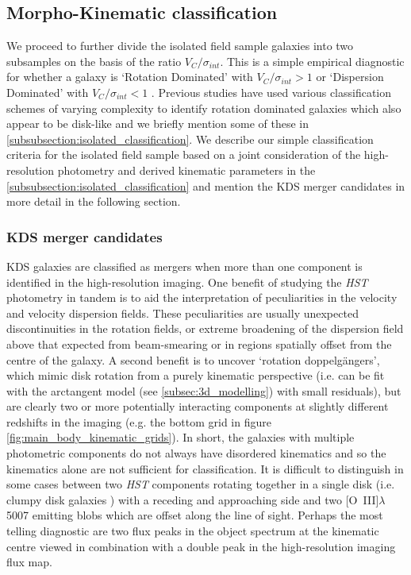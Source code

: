 \documentclass[fleqn,usenatbib]{mn2e}
\begin{document}
\subsection{Morpho-Kinematic classification}\label{subsec:morpho-kin-class}
We proceed to further divide the isolated field sample galaxies into two subsamples on the basis of the ratio $V_{C}/\sigma_{int}$.
This is a simple empirical diagnostic for whether a galaxy is `Rotation Dominated' with $V_{C}/\sigma_{int} > 1$ or `Dispersion Dominated' with $V_{C}/\sigma_{int} < 1$  \citep[i.e. a simple way to measure the prevalence of rotational and random motions][]{Epinat2012,Wisnioski2015,Stott2016,Harrison2017}.
Previous studies have used various classification schemes of varying complexity to identify rotation dominated galaxies which also appear to be disk-like and we briefly mention some of these in \cref{subsubsection:isolated_classification}.
We describe our simple classification criteria for the isolated field sample based on a joint consideration of the high-resolution photometry and derived kinematic parameters in the \cref{subsubsection:isolated_classification} and mention the KDS merger candidates in more detail in the following section.

\subsubsection{KDS merger candidates}\label{subsubsection:merger_candidates}
KDS galaxies are classified as mergers when more than one component is identified in the high-resolution imaging.  
One benefit of studying the {\em HST} photometry in tandem is to aid the interpretation of peculiarities in the velocity and velocity dispersion fields.
These peculiarities are usually unexpected discontinuities in the rotation fields, or extreme broadening of the dispersion field above that expected from beam-smearing or in regions spatially offset from the centre of the galaxy.
A second benefit is to uncover `rotation doppelg{\"a}ngers', which mimic disk rotation from a purely kinematic perspective (i.e. can be fit with the arctangent model (see \cref{subsec:3d_modelling}) with small residuals), but are clearly two or more potentially interacting components at slightly different redshifts in the imaging (e.g. the bottom grid in figure \ref{fig:main_body_kinematic_grids}).
In short, the galaxies with multiple photometric components do not always have disordered kinematics and so the kinematics alone are not sufficient for classification.
It is difficult to distinguish in some cases between two {\em HST} components rotating together in a single disk (i.e. clumpy disk galaxies \citep[e.g.][]{Elmegreen2004,Bournaud2007}) with a receding and approaching side and two [O~{\sc III}]$\lambda$5007 emitting blobs which are offset along the line of sight.
Perhaps the most telling diagnostic are two flux peaks in the object spectrum at the kinematic centre viewed in combination with a double peak in the high-resolution imaging flux map. \\
\end{document}
